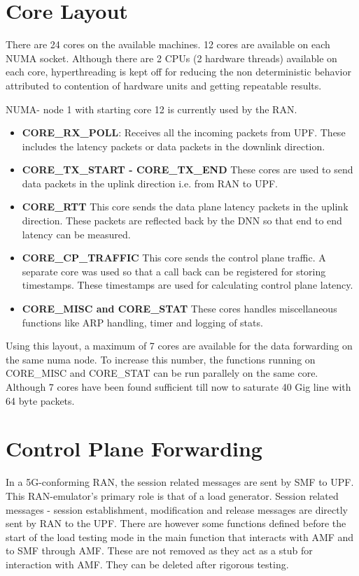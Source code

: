 

\section{Core Layout}
There are 24 cores on the available machines. 12 cores are available on each NUMA socket.
Although there are 2 CPUs (2 hardware threads) available on each core, hyperthreading is
kept off for reducing the non deterministic behavior attributed to contention of hardware units
and getting repeatable results.

NUMA- node 1 with starting core 12 is currently used by the RAN.


\begin{itemize}
	\item \textbf{CORE\_RX\_POLL}: Receives all the incoming packets from UPF. These includes the latency packets or data packets in the downlink direction.
	\item \textbf{CORE\_TX\_START - CORE\_TX\_END}
	      These cores are used to send data packets in the uplink  direction i.e. from RAN to UPF.
	\item \textbf{CORE\_RTT}
	      This core sends the data plane latency packets in the uplink direction. These packets are reflected back by the DNN so that end to end latency can be measured.
	\item \textbf{CORE\_CP\_TRAFFIC} This core sends the control plane traffic. A separate core was used so that a call back can be registered for storing timestamps. These timestamps are used for calculating control plane latency.
	\item \textbf{CORE\_MISC and CORE\_STAT}
	      These cores handles miscellaneous functions like ARP handling, timer and logging of stats.
\end{itemize}
Using this layout, a maximum of 7 cores are available for the data forwarding on the same numa node.
To increase this number, the functions running on CORE\_MISC and CORE\_STAT can be run parallely on the same core. Although 7 cores have been found sufficient till now to saturate 40 Gig line with 64 byte packets.

\section{Control Plane Forwarding}
In a 5G-conforming RAN, the session related messages are sent by SMF to UPF.
This RAN-emulator's primary role is that of a load generator. Session related messages - session establishment, modification and release messages are directly sent by RAN to the UPF.
There are however some functions defined before the start of the load testing mode in the main function that interacts with AMF and to SMF through AMF. These are not removed as they act as a stub for interaction with AMF. They can be deleted after rigorous testing.

